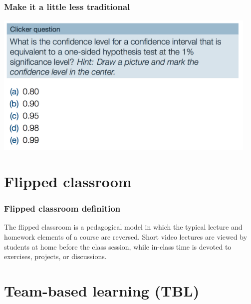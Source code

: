 \documentclass{beamer}
\begin{document}

\begin{frame}
\frametitle{Make it a little less traditional}

\begin{center}
\includegraphics[width = 0.95\textwidth]{figures/clicker_question}
\end{center}

\vfill

\end{frame}


\section{Flipped classroom}


\begin{frame}
\frametitle{Flipped classroom definition}

The flipped classroom is a pedagogical model in which the typical lecture and 
homework elements of a course are reversed. Short video lectures are viewed 
by students at home before the class session, while in-class time is devoted to 
exercises, projects, or discussions.

\end{frame}


\section{Team-based learning (TBL)}
\end{document}
